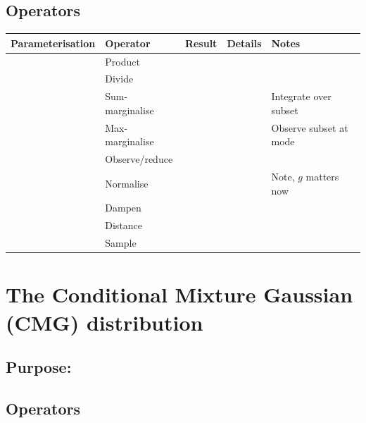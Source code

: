 \documentclass[oneside,english]{scrbook}
\begin{document}
\section{Operators}
\begin{tabular}{lllll}
  Parameterisation         & Operator             & Result                   & Details & Notes\\ \hline
                           & Product              &                          &         & \parbox{0.4\textwidth}{}\\
                           & Divide               &                          &         & \parbox{0.4\textwidth}{}\\
                           & Sum-marginalise      &                          &         & \parbox{0.4\textwidth}{Integrate over subset}\\
                           & Max-marginalise      &                          &         & \parbox{0.4\textwidth}{Observe subset at mode}\\
                           & Observe/reduce       &                          &         & \parbox{0.4\textwidth}{}\\
                           & Normalise            &                          &         & \parbox{0.4\textwidth}{Note, $g$ matters now}\\
                           & Dampen               &                          &         & \parbox{0.4\textwidth}{}\\
                           & Distance             &                          &         & \parbox{0.4\textwidth}{}\\
                           & Sample               &                          &         & \parbox{0.4\textwidth}{}\\
\end{tabular}

\chapter{The Conditional Mixture Gaussian (CMG) distribution}

\section{Purpose:}
\section{Operators}
\end{document}
